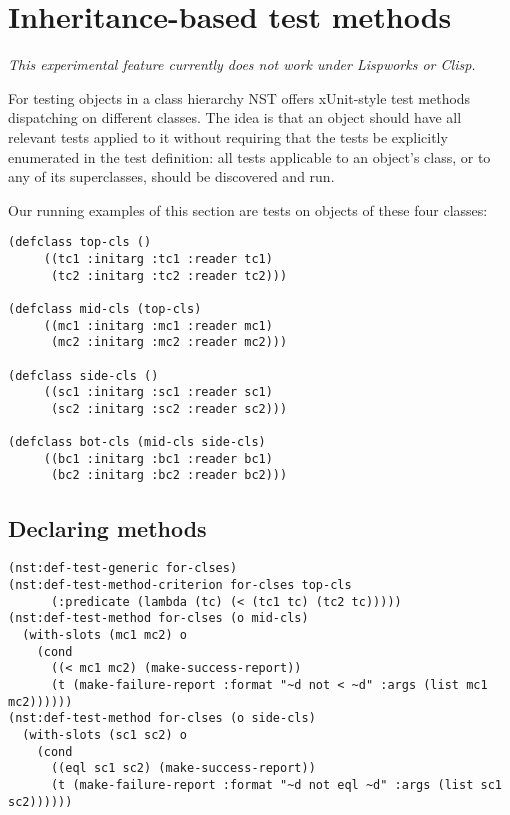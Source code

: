 
\section{Inheritance-based test methods}
\label{sec:methods}
\emph{This experimental feature currently does not work under Lispworks or Clisp.}

For testing objects in a class hierarchy NST offers xUnit-style test
methods dispatching on different classes.  The idea is that an object
should have all relevant tests applied to it without requiring that
the tests be explicitly enumerated in the test definition: all tests
applicable to an object's class, or to any of its superclasses, should
be discovered and run.

Our running examples of this section are tests on objects of these
four classes:
\begin{verbatim}
(defclass top-cls ()
     ((tc1 :initarg :tc1 :reader tc1)
      (tc2 :initarg :tc2 :reader tc2)))

(defclass mid-cls (top-cls)
     ((mc1 :initarg :mc1 :reader mc1)
      (mc2 :initarg :mc2 :reader mc2)))

(defclass side-cls ()
     ((sc1 :initarg :sc1 :reader sc1)
      (sc2 :initarg :sc2 :reader sc2)))

(defclass bot-cls (mid-cls side-cls)
     ((bc1 :initarg :bc1 :reader bc1)
      (bc2 :initarg :bc2 :reader bc2)))
\end{verbatim}

\subsection{Declaring methods}

\begin{verbatim}
(nst:def-test-generic for-clses)
(nst:def-test-method-criterion for-clses top-cls
      (:predicate (lambda (tc) (< (tc1 tc) (tc2 tc)))))
(nst:def-test-method for-clses (o mid-cls)
  (with-slots (mc1 mc2) o
    (cond
      ((< mc1 mc2) (make-success-report))
      (t (make-failure-report :format "~d not < ~d" :args (list mc1 mc2))))))
(nst:def-test-method for-clses (o side-cls)
  (with-slots (sc1 sc2) o
    (cond
      ((eql sc1 sc2) (make-success-report))
      (t (make-failure-report :format "~d not eql ~d" :args (list sc1 sc2))))))
\end{verbatim}

